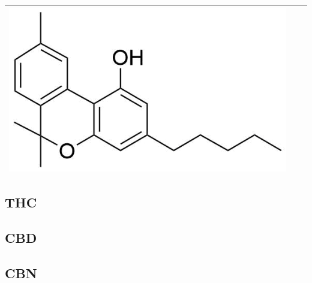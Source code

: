 \begin{table}
\begin{tabular}{lcc}
\begin{minipage}[c]{0.35\linewidth}
\includegraphics[height=0.12\textheight]{pics/other_drugs/CBN_struct.png}\end{minipage}\\ 
\bottomrule
\end{tabular}
\label{tab:CAN_structs}
\end{table}












\subsection{THC}



\subsection{CBD}


\subsection{CBN}

